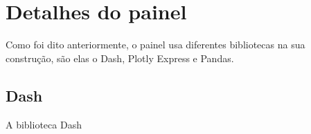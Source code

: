 \chapter{Detalhes do painel}\label{cap_trabalho_academico}

Como foi dito anteriormente, o painel usa diferentes bibliotecas na sua construção, são elas o Dash, Plotly Express e Pandas.

\section{Dash}

A biblioteca Dash